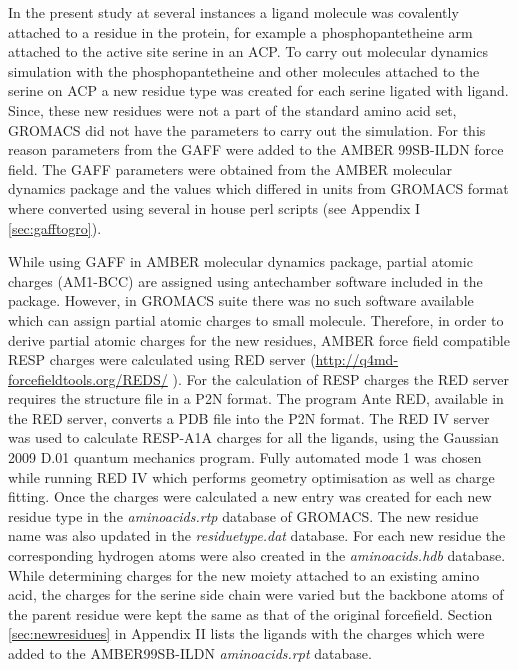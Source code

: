 			In the present study at several instances a ligand molecule was covalently attached to a residue in the protein, for example a phosphopantetheine arm attached to the active site serine in an ACP. To carry out molecular dynamics simulation with the phosphopantetheine and other molecules attached to the serine on ACP a new residue type was created for each serine ligated with ligand. Since, these new residues were not a part of the standard amino acid set, GROMACS did not have the parameters to carry out the simulation. For this reason parameters from the GAFF were added to the AMBER 99SB-ILDN \parencite{Lindorff-Larsen2010} force field. The GAFF parameters were obtained from the AMBER molecular dynamics package and the values which differed in units from GROMACS format where converted using several in house perl scripts (see Appendix I \ref{sec:gafftogro}).
			
			While using GAFF in AMBER molecular dynamics package, partial atomic charges (AM1-BCC) are assigned using antechamber software included in the package. However, in GROMACS suite there was no such software available which can assign partial atomic charges to small molecule. %
			Therefore, in order to derive partial atomic charges for the new residues, AMBER force field compatible RESP charges were calculated using RED server (\url{http://q4md-forcefieldtools.org/REDS/} \parencite{Bayly1993, Dupradeau2010b, Vanquelef2011}). For the calculation of RESP charges the RED server requires the structure file in a P2N format. The program Ante RED, available in the RED server, converts a  PDB file into the P2N format. The RED IV server was used to calculate RESP-A1A charges for all the ligands, using the Gaussian 2009 D.01 quantum mechanics program. Fully automated mode 1 was chosen while running RED IV which performs geometry optimisation as well as charge fitting. Once the charges were calculated a new entry was created for each new residue type in the \textit{aminoacids.rtp} database of GROMACS. The new residue name was also updated in the \textit{residuetype.dat}  database. For each new residue the corresponding hydrogen atoms were also created in the \textit{aminoacids.hdb} database. While determining charges for the new moiety attached to an existing amino acid, the charges for the serine side chain were varied but the backbone atoms of the parent residue were kept the same as that of the original forcefield. Section \ref{sec:newresidues} in Appendix II lists the ligands with the charges which were added to the AMBER99SB-ILDN \textit{aminoacids.rpt} database.
				
